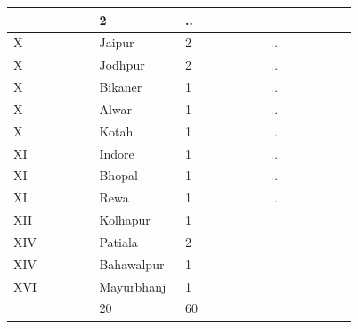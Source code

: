 \begin{longtable}{|p{0.23\linewidth}|p{0.23\linewidth}|p{0.23\linewidth}|p{0.23\linewidth}|}
 & 2

 & ..

 \\
\hline
X

 & Jaipur

 & 2

 & ..

 \\
\hline
X

 & Jodhpur

 & 2

 & ..

 \\
\hline
X

 & Bikaner

 & 1

 & ..

 \\
\hline
X

 & Alwar

 & 1

 & ..

 \\
\hline
X

 & Kotah

 & 1

 & ..

 \\
\hline
XI

 & Indore

 & 1

 & ..

 \\
\hline
XI

 & Bhopal

 & 1

 & ..

 \\
\hline
XI

 & Rewa

 & 1

 & ..

 \\
\hline
XII

 & Kolhapur

 & 1

 & 

 \\
\hline
XIV

 & Patiala

 & 2

 & 

 \\
\hline
XIV

 & Bahawalpur

 & 1

 & 

 \\
\hline
XVI

 & Mayurbhanj

 & 1

 & 

 \\
\hline


 & 20

 & 60

 & 

 \\
\hline
\end{longtable}
